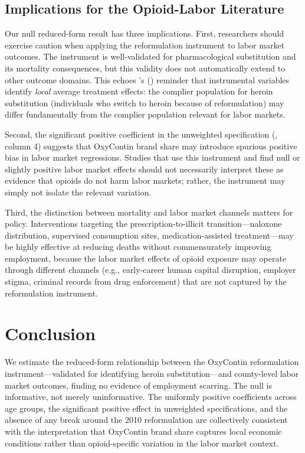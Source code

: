 \documentclass[12pt]{article}
\begin{document}
\subsection{Implications for the Opioid-Labor Literature}

Our null reduced-form result has three implications. First, researchers should exercise caution when applying the reformulation instrument to labor market outcomes. The instrument is well-validated for pharmacological substitution and its mortality consequences, but this validity does not automatically extend to other outcome domains. This echoes \citeauthor{angrist1996}'s (\citeyear{angrist1996}) reminder that instrumental variables identify \textit{local} average treatment effects: the complier population for heroin substitution (individuals who switch to heroin because of reformulation) may differ fundamentally from the complier population relevant for labor markets.

Second, the significant positive coefficient in the unweighted specification (, column 4) suggests that OxyContin brand share may introduce spurious positive bias in labor market regressions. Studies that use this instrument and find null or slightly positive labor market effects should not necessarily interpret these as evidence that opioids do not harm labor markets; rather, the instrument may simply not isolate the relevant variation.

Third, the distinction between mortality and labor market channels matters for policy. Interventions targeting the prescription-to-illicit transition---naloxone distribution, supervised consumption sites, medication-assisted treatment---may be highly effective at reducing deaths \citep{wen2017, dave2019} without commensurately improving employment, because the labor market effects of opioid exposure may operate through different channels (e.g., early-career human capital disruption, employer stigma, criminal records from drug enforcement) that are not captured by the reformulation instrument.


\section{Conclusion}
\label{sec:conclusion}

We estimate the reduced-form relationship between the OxyContin reformulation instrument---validated for identifying heroin substitution---and county-level labor market outcomes, finding no evidence of employment scarring. The null is informative, not merely uninformative. The uniformly positive coefficients across age groups, the significant positive effect in unweighted specifications, and the absence of any break around the 2010 reformulation are collectively consistent with the interpretation that OxyContin brand share captures local economic conditions rather than opioid-specific variation in the labor market context.
\end{document}
